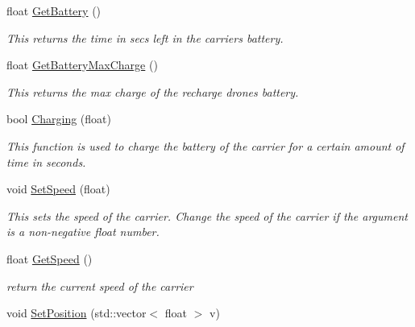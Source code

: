 \begin{DoxyCompactItemize}
\mbox{\label{classcsci3081_1_1RechargeDrone_a77787f8e9b4ae3b3575e6c68ba3e8ca3}} 
float \hyperlink{classcsci3081_1_1RechargeDrone_a77787f8e9b4ae3b3575e6c68ba3e8ca3}{Get\+Battery} ()
\begin{DoxyCompactList}\small\item\em This returns the time in secs left in the carrier\textquotesingle{}s battery. \end{DoxyCompactList}\item 
\mbox{\label{classcsci3081_1_1RechargeDrone_a52a715c52891edfcc9a31b06c30d6198}} 
float \hyperlink{classcsci3081_1_1RechargeDrone_a52a715c52891edfcc9a31b06c30d6198}{Get\+Battery\+Max\+Charge} ()
\begin{DoxyCompactList}\small\item\em This returns the max charge of the recharge drone\textquotesingle{}s battery. \end{DoxyCompactList}\item 
bool \hyperlink{classcsci3081_1_1RechargeDrone_a54f93680add2c289a2b354e1331ad81f}{Charging} (float)
\begin{DoxyCompactList}\small\item\em This function is used to charge the battery of the carrier for a certain amount of time in seconds. \end{DoxyCompactList}\item 
void \hyperlink{classcsci3081_1_1RechargeDrone_a4cfa100bfeabb0b9c893c74a6aeffc23}{Set\+Speed} (float)
\begin{DoxyCompactList}\small\item\em This sets the speed of the carrier. Change the speed of the carrier if the argument is a non-\/negative float number. \end{DoxyCompactList}\item 
\mbox{\label{classcsci3081_1_1RechargeDrone_aded486fd6cf88c9f773953daf3d492a4}} 
float \hyperlink{classcsci3081_1_1RechargeDrone_aded486fd6cf88c9f773953daf3d492a4}{Get\+Speed} ()
\begin{DoxyCompactList}\small\item\em return the current speed of the carrier \end{DoxyCompactList}\item 
void \hyperlink{classcsci3081_1_1RechargeDrone_a226ad5a957052707e19d986a94a53c2d}{Set\+Position} (std\+::vector$<$ float $>$ v)

\end{DoxyCompactItemize}
